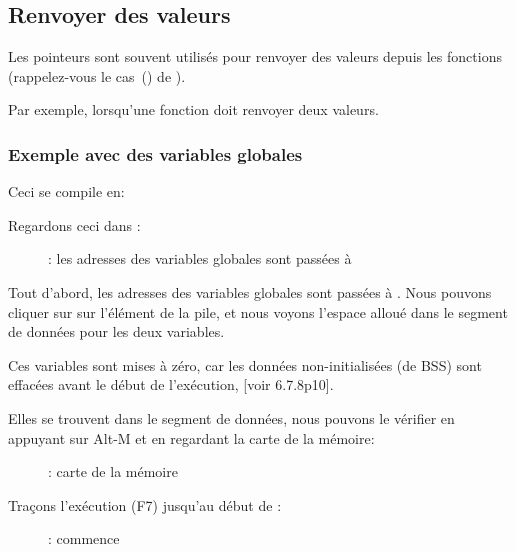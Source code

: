 \subsection{Renvoyer des valeurs}

Les pointeurs sont souvent utilisés pour renvoyer des valeurs depuis les fonctions
(rappelez-vous le cas~() de \scanf).

Par exemple, lorsqu'une fonction doit renvoyer deux valeurs.

\subsubsection{Exemple avec des variables globales}



Ceci se compile en:



\myindex{\olly}
\clearpage
Regardons ceci dans \olly:

\begin{figure}[H]
\centering
{}
\caption{\olly: 
les adresses des variables globales sont passées à \ttfone}
\label{fig:pointers_olly_global_1}
\end{figure}

Tout d'abord, les adresses des variables globales sont passées à \ttfone.
Nous pouvons cliquer sur 
sur l'élément de la pile, et nous voyons l'espace alloué dans le segment de données
pour les deux variables.

\clearpage
Ces variables sont mises à zéro, car les données non-initialisées (de
\ac{BSS}) sont effacées avant le début de l'exécution, [voir \CNineNineStd{} 6.7.8p10].

Elles se trouvent dans le segment de données, nous pouvons le vérifier en appuyant
sur Alt-M et en regardant la carte de la mémoire:

\begin{figure}[H]
\centering
{}
\caption{\olly: carte de la mémoire}
\label{fig:pointers_olly_global_5}
\end{figure}

\clearpage
Traçons l'exécution (F7) jusqu'au début de \ttfone:

\begin{figure}[H]
\centering
{}
\caption{\olly: \ttfone commence}
\label{fig:pointers_olly_global_2}
\end{figure}

